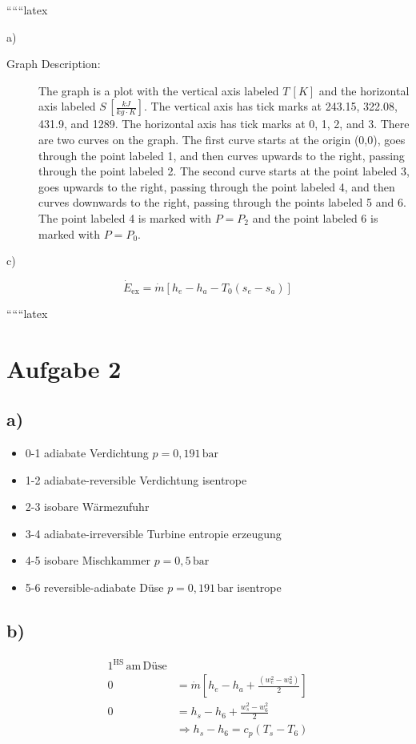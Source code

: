 
``````latex


a)

\begin{description}
    \item[Graph Description:] The graph is a plot with the vertical axis labeled \( T \, [K] \) and the horizontal axis labeled \( S \, \left[ \frac{kJ}{kg \cdot K} \right] \). The vertical axis has tick marks at 243.15, 322.08, 431.9, and 1289. The horizontal axis has tick marks at 0, 1, 2, and 3. There are two curves on the graph. The first curve starts at the origin (0,0), goes through the point labeled 1, and then curves upwards to the right, passing through the point labeled 2. The second curve starts at the point labeled 3, goes upwards to the right, passing through the point labeled 4, and then curves downwards to the right, passing through the points labeled 5 and 6. The point labeled 4 is marked with \( P = P_2 \) and the point labeled 6 is marked with \( P = P_0 \).
\end{description}

c)

\[
\dot{E}_{\text{ex}} = \dot{m} \left[ h_e - h_a - T_0 (s_e - s_a) \right]
\]

``````latex


\section*{Aufgabe 2}

\subsection*{a)}
\begin{itemize}
    \item 0-1 adiabate Verdichtung \hfill $p = 0{,}191 \, \text{bar}$
    \item 1-2 adiabate-reversible Verdichtung \hfill isentrope
    \item 2-3 isobare Wärmezufuhr
    \item 3-4 adiabate-irreversible Turbine \hfill entropie erzeugung
    \item 4-5 isobare Mischkammer \hfill $p = 0{,}5 \, \text{bar}$
    \item 5-6 reversible-adiabate Düse \hfill $p = 0{,}191 \, \text{bar}$ \hfill isentrope
\end{itemize}

\subsection*{b)}
\begin{align*}
    1^{\text{HS}} \, \text{am} \, \text{Düse} \\
    0 &= \dot{m} \left[ h_e - h_a + \frac{(w_e^2 - w_a^2)}{2} \right] \\
    0 &= h_s - h_6 + \frac{w_s^2 - w_6^2}{2} \\
    &\Rightarrow h_s - h_6 = c_p (T_s - T_6)
\end{align*}

